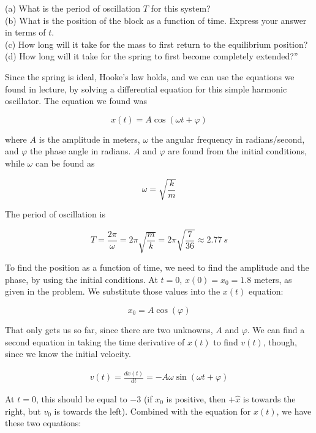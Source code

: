 \documentclass[8.01x]{subfiles}
\begin{document}
(a) What is the period of oscillation $T$ for this system?\\
(b) What is the position of the block as a function of time. Express your answer in terms of $t$.\\
(c) How long will it take for the mass to first return to the equilibrium position?\\
(d) How long will it take for the spring to first become completely extended?''

Since the spring is ideal, Hooke's law holds, and we can use the equations we found in lecture, by solving a differential equation for this simple harmonic oscillator. The equation we found was

\begin{equation}
x(t) = A \cos(\omega t + \varphi)
\end{equation}

where $A$ is the amplitude in meters, $\omega$ the angular frequency in radians/second, and $\varphi$ the phase angle in radians. $A$ and $\varphi$ are found from the initial conditions, while $\omega$ can be found as

\begin{equation}
\omega = \sqrt{\frac{k}{m}}
\end{equation}

The period of oscillation is

\begin{equation}
T = \frac{2 \pi}{\omega} = 2 \pi\sqrt{\frac{m}{k}} = 2 \pi \sqrt{\frac{7}{36}} \approx \SI{2.77}{s}
\end{equation}

To find the position as a function of time, we need to find the amplitude and the phase, by using the initial conditions. At $t = 0$, $x(0) = x_0 = 1.8$ meters, as given in the problem. We substitute those values into the $x(t)$ equation:

\begin{equation}
x_0 = A \cos(\varphi)
\end{equation}

That only gets us so far, since there are two unknowns, $A$ and $\varphi$. We can find a second equation in taking the time derivative of $x(t)$ to find $v(t)$, though, since we know the initial velocity.

\begin{align}
v(t) = \frac{dx(t)}{dt} = -A \omega \sin(\omega t + \varphi)
\end{align}

At $t = 0$, this should be equal to $-3$ (if $x_0$ is positive, then $+\hat{x}$ is towards the right, but $v_0$ is towards the left). Combined with the equation for $x(t)$, we have these two equations:
\end{document}
